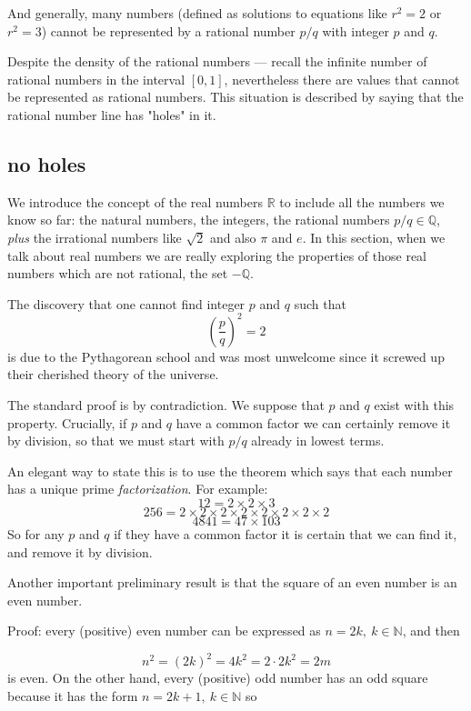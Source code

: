 \documentclass[11pt, oneside]{article}
\begin{document}
And generally, many numbers (defined as solutions to equations like $r^2 = 2$ or $r^2 = 3$) cannot be represented by a rational number $p/q$ with integer $p$ and $q$.  

Despite the density of the rational numbers --- recall the infinite number of rational numbers in the interval $[0,1]$, nevertheless there are values that cannot be represented as rational numbers.  This situation is described by saying that the rational number line has "holes" in it.

\subsection*{no holes}

We introduce the concept of the real numbers $\mathbb{R}$ to include all the numbers we know so far: the natural numbers, the integers, the rational numbers $p/q \in \mathbb{Q}$, \emph{plus} the irrational numbers like $\sqrt{2}$ and also $\pi$ and $e$.  In this section, when we talk about real numbers we are really exploring the properties of those real numbers which are not rational, the set $- \mathbb{Q}$. 

The discovery that one cannot find integer $p$ and $q$ such that
\[ (\frac{p}{q})^2 = 2 \]
is due to the Pythagorean school and was most unwelcome since it screwed up their cherished theory of the universe.

The standard proof is by contradiction.  We suppose that $p$ and $q$ exist with this property.  Crucially, if $p$ and $q$ have a common factor we can certainly remove it by division, so that we must start with $p/q$ already in lowest terms.

An elegant way to state this is to use the theorem which says that each number has a unique prime \emph{factorization}.  For example:
\[ 12 = 2 \times 2 \times 3 \]
\[ 256 = 2 \times 2 \times 2 \times 2 \times 2 \times 2 \times 2 \times 2 \]
\[ 4841 = 47 \times 103 \]
So for any $p$ and $q$ if they have a common factor it is certain that we can find it, and remove it by division.

Another important preliminary result is that the square of an even number is an even number.

Proof:  every (positive) even number can be expressed as $n = 2k, \ k \in \mathbb{N}$, and then

\[ n^2 = (2k)^2 = 4k^2 = 2 \cdot 2 k^2 = 2m \]
is even.  On the other hand, every (positive) odd number has an odd square because it has the form $n = 2k + 1, \ k \in \mathbb{N}$ so
\end{document}
